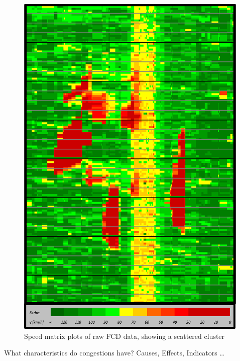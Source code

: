 \documentclass[a4paper,12pt]{report}
\begin{document}
\begin{figure}[h]
	\centering
	\includegraphics[scale=0.8]{./assets/SpeedMatrixPlot_single}
	\caption{Speed matrix plots of raw FCD data, showing a scattered cluster}
	\label{img:speedMatrixPlot_singleCluster}
\end{figure}

What characteristics do congestions have? Causes, Effects, Indicators … 
\end{document}
